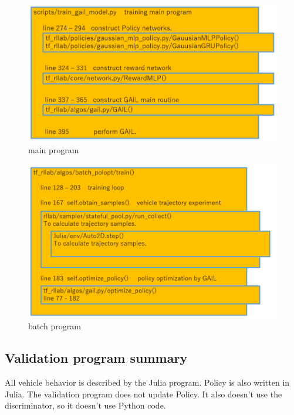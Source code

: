 \begin{figure}[H]
\begin{center}
\includegraphics[width=12cm]{./figures/training_main_program.png}
\caption{main program}
\label{fig:training_main}
\end{center}
\end{figure}



\begin{figure}[H]
\begin{center}
\includegraphics[width=12cm]{./figures/training_batch_program.png}
\caption{batch program}
\label{fig:training_batch}
\end{center}
\end{figure}








\subsection{Validation program summary}

All vehicle behavior is described by the Julia program. 
Policy is also written in Julia.
The validation program does not update Policy. It also doesn't use the discriminator, so it doesn't use Python code.

